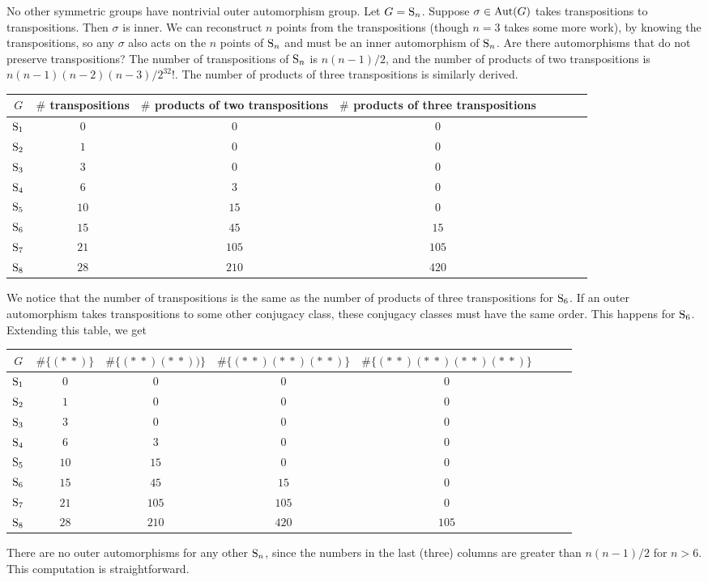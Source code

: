 \documentclass[11pt, oneside]{amsart}
\begin{document}
No other symmetric groups have nontrivial outer automorphism group. Let $G = \operatorname{S}_n$. Suppose $\sigma\in \operatorname{Aut}(G)$ takes transpositions to transpositions. Then $\sigma$ is inner. We can reconstruct $n$ points from the transpositions (though $n=3$ takes some more work), by knowing the transpositions, so any $\sigma $ also acts on the $n$ points of $\operatorname{S}_n$ and must be an inner automorphism of $\operatorname{S}_n$. Are there automorphisms that do not preserve transpositions? The number of transpositions of $\operatorname{S}_n $ is $n(n-1)/2$, and the number of products of two transpositions is $n(n-1)(n-2)(n-3)/2^32!$. The number of products of three transpositions is similarly derived.
\begin{center}
\begin{tabular}{cccccccc} 
    {$G$} & {$\#$ transpositions} & {$\#$ products of two transpositions} & {$\#$ products of three transpositions} \\
    \midrule
    {$\operatorname{S}_1$} & $0$ & $0$ & $0$ \\ 
    {$\operatorname{S}_2$} & $1$ & $0$ & $0$ \\
    {$\operatorname{S}_3$} & $3$ & $0$ & $0$ \\
    {$\operatorname{S}_4$} & $6$ & $3$ & $0$ \\
    {$\operatorname{S}_5$} & $10$ & $15$ & $0$ \\
    {$\operatorname{S}_6$} & $15$ & $45$ & $15$ \\
    {$\operatorname{S}_7$} & $21$ & $105$ & $105$ \\
    {$\operatorname{S}_8$} & $28$ & $210$ & $420$ \\
\end{tabular}
\end{center}
We notice that the number of transpositions is the same as the number of products of three transpositions for $\operatorname{S}_6$. If an outer automorphism takes transpositions to some other conjugacy class, these conjugacy classes must have the same order. This happens for $\operatorname{S}_6$. Extending this table, we get
\begin{center}
\begin{tabular}{cccccccc} 
    {$G$} & {$\# \{ (*\ *)\}$} & {$\# \{ (*\ *)(*\ *))\}$} & {$\# \{ (*\ *)(*\ *)(*\ *)\}$} & {$\# \{ (*\ *)(*\ *)(*\ *)(*\ *)\}$} \\
    \midrule
    {$\operatorname{S}_1$} & $0$ & $0$ & $0$ & $0$\\ 
    {$\operatorname{S}_2$} & $1$ & $0$ & $0$& $0$\\ 
    {$\operatorname{S}_3$} & $3$ & $0$ & $0$ & $0$\\ 
    {$\operatorname{S}_4$} & $6$ & $3$ & $0$ & $0$\\ 
    {$\operatorname{S}_5$} & $10$ & $15$ & $0$ & $0$\\ 
    {$\operatorname{S}_6$} & $15$ & $45$ & $15$ & $0$\\ 
    {$\operatorname{S}_7$} & $21$ & $105$ & $105$ & $0$\\ 
    {$\operatorname{S}_8$} & $28$ & $210$ & $420$ & $105$\\ 
\end{tabular}
\end{center}
There are no outer automorphisms for any other $\operatorname{S}_n$, since the numbers in the last (three) columns are greater than $n(n-1)/2$ for $n>6$. This computation is straightforward. 
\end{document}
